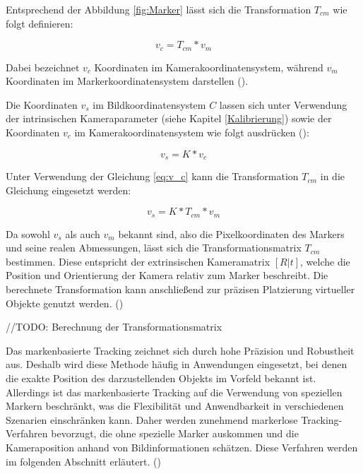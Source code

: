 Entsprechend der Abbildung \ref{fig:Marker} lässt sich die Transformation \( T_{cm} \) wie folgt definieren:

\begin{equation}\label{eq:v_c}
    v_c = T_{cm} * v_m
\end{equation}

Dabei bezeichnet \( v_c \) Koordinaten im Kamerakoordinatensystem, während \( v_m \) Koordinaten im Markerkoordinatensystem darstellen (\cite{doerner2022virtual}).  

Die Koordinaten \( v_s \) im Bildkoordinatensystem \( C \) lassen sich unter Verwendung der intrinsischen Kameraparameter (siehe Kapitel \ref{Kalibrierung}) sowie der Koordinaten \( v_c \) im Kamerakoordinatensystem wie folgt ausdrücken (\cite{doerner2022virtual}):


\begin{equation}
    v_s = K * v_c
\end{equation}

Unter Verwendung der Gleichung \ref{eq:v_c} kann die Transformation \( T_{cm} \) in die Gleichung eingesetzt werden:

\begin{equation}
    v_s = K * T_{cm} * v_m
\end{equation}

Da sowohl \( v_s \) als auch \( v_m \) bekannt sind, also die Pixelkoordinaten des Markers und seine realen Abmessungen, lässt sich die Transformationsmatrix \( T_{cm} \) bestimmen. Diese entspricht der extrinsischen Kameramatrix \( [R|t] \), welche die Position und Orientierung der Kamera relativ zum Marker beschreibt. Die berechnete Transformation kann anschließend zur präzisen Platzierung virtueller Objekte genutzt werden. (\cite{doerner2022virtual}) 


//TODO: Berechnung der Transformationsmatrix

Das markenbasierte Tracking zeichnet sich durch hohe Präzision und Robustheit aus. Deshalb wird diese Methode häufig in Anwendungen eingesetzt, bei denen die exakte Position des darzustellenden Objekts im Vorfeld bekannt ist. Allerdings ist das markenbasierte Tracking auf die Verwendung von speziellen Markern beschränkt, was die Flexibilität und Anwendbarkeit in verschiedenen Szenarien einschränken kann. Daher werden zunehmend markerlose Tracking-Verfahren bevorzugt, die ohne spezielle Marker auskommen und die Kameraposition anhand von Bildinformationen schätzen. Diese Verfahren werden im folgenden Abschnitt erläutert. (\cite{doerner2022virtual})

